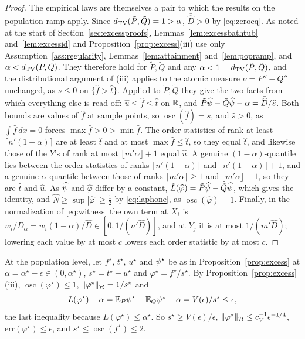 \begin{proof}
The empirical laws are themselves a pair to which the results on the population ramp apply. Since
$d_{\mathrm{TV}}(\tilde P,\tilde Q)=1>\alpha$, $\bar{\widehat D}>0$ by \eqref{eq:zeroeq}. As noted at the start of
Section~\ref{sec:excessproofs}, Lemmas~\ref{lem:excessbathtub} and~\ref{lem:excessid} and
Proposition~\ref{prop:excess}(iii) use only Assumption~\ref{ass:regularity}, Lemmas~\ref{lem:attainment}
and~\ref{lem:popramp}, and $\alpha<d_{\mathrm{TV}}(P,Q)$. They therefore hold for $\tilde P,\tilde Q$ and any
$\alpha<1=d_{\mathrm{TV}}(\tilde P,\tilde Q)$,
and the distributional argument of (iii) applies to the atomic measure $\nu=P''-Q''$ unchanged, as $\nu\le0$ on
$\{\widehat f>\widehat t\}$. Applied to $\tilde P,\tilde Q$ they give the two facts from which everything else is read
off: $\widehat u\le\widehat f\le\widehat t$ on $\mathbb{R}$, and $\tilde P\widehat{\psi}-\tilde Q\widehat{\psi}-\alpha=\bar{\widehat D}/\widehat s$. Both bounds are values of $\widehat f$ at sample points, so
$\operatorname{osc}(\widehat f)=\widehat s$, and $\widehat s>0$, as $\int\widehat f\,dx=0$ forces
$\max\widehat f>0>\min\widehat f$. The order statistics of rank at least $\lceil n'(1-\alpha)\rceil$ are at least
$\widehat t$ and at most $\max\widehat f\le\widehat t$, so they equal $\widehat t$, and likewise those of the $Y$'s of
rank at most $\lfloor m'\alpha\rfloor+1$ equal $\widehat u$. A genuine $(1-\alpha)$-quantile lies between the order
statistics of ranks $\lceil n'(1-\alpha)\rceil$ and $\lfloor n'(1-\alpha)\rfloor+1$, and a genuine $\alpha$-quantile
between those of ranks $\lceil m'\alpha\rceil\ge1$ and $\lfloor m'\alpha\rfloor+1$, so they are $\widehat t$ and
$\widehat u$. As $\widehat{\psi}$ and $\widehat\varphi$ differ by a constant, $\tilde L(\widehat\varphi)=\tilde
P\widehat{\psi}-\tilde Q\widehat{\psi}$, which gives the identity, and $\widehat N\ge\sup|\widehat\varphi|\ge\tfrac12$ by
\eqref{eq:laphone}, as $\operatorname{osc}(\widehat\varphi)=1$. Finally, in the normalization of \eqref{eq:witness} the
own term at $X_i$ is $w_i/\widehat D_\alpha=w_i(1-\alpha)/\bar{\widehat D}\in[0,1/(n'\bar{\widehat D})]$, and at $Y_j$ it
is at most $1/(m'\bar{\widehat D})$; lowering each value by at most $c$ lowers each order statistic by at most $c$.
\end{proof}

At the population level, let $f^\star$, $t^\star$, $u^\star$ and $\psi^\star$ be as in
Proposition~\ref{prop:excess} at $\alpha=\alpha^\star-\epsilon\in(0,\alpha^\star)$, $s^\star=t^\star-u^\star$ and
$\varphi^\star=f^\star/s^\star$. By Proposition~\ref{prop:excess}(iii), $\operatorname{osc}(\varphi^\star)\le1$,
$\|\varphi^\star\|_{\mathcal{H}}=1/s^\star$ and
\begin{equation}
L(\varphi^\star)-\alpha=\mathbb{E}_P\psi^\star-\mathbb{E}_Q\psi^\star-\alpha=V(\epsilon)/s^\star\le\epsilon ,
\label{eq:lappop}
\end{equation}
the last inequality because $L(\varphi^\star)\le\alpha^\star$. So $s^\star\ge V(\epsilon)/\epsilon$,
$\|\varphi^\star\|_{\mathcal{H}}\le c_V^{-1}\epsilon^{-1/4}$, $\mathrm{err}(\varphi^\star)\le\epsilon$, and $s^\star\le\operatorname{osc}(f^\star)\le2$.

